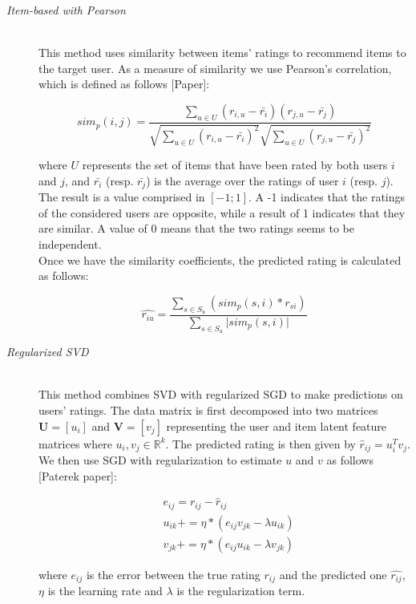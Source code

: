 \documentclass[10pt,conference,compsocconf]{IEEEtran}
\begin{document}
\begin{description}

\item[\emph{Item-based with Pearson}]\ \\
This method uses similarity between items' ratings to recommend items to the target user. As a measure of similarity we use Pearson's correlation, which is defined as follows [Paper]:

$$
sim_p(i, j) = \frac{\sum_{u \in U} (r_{i,u} - \bar{r_i})(r_{j,u} - \bar{r_j})}{\sqrt{\sum_{u \in U} (r_{i,u} - \bar{r_i})^2}	\sqrt{\sum_{u \in U} (r_{j,u} - \bar{r_j})^2}}
$$

where $U$ represents the set of items that have been rated by both users $i$ and $j$, and $\bar{r_i}$ (resp. $\bar{r_j}$) is the average over the ratings of user $i$ (resp. $j$). The result is a value comprised in $[-1;1]$. A -1 indicates that the ratings of the considered users are opposite, while a result of 1 indicates that they are similar. A value of 0 means that the two ratings seems to be independent. \\
Once we have the similarity coefficients, the predicted rating is calculated as follows:

$$
\hat{r_{iu}} = \frac{\sum_{s \in S_u} (sim_p(s, i) \ast r_{si} )}{\sum_{s \in S_u} \vert sim_p(s, i) \vert}
$$ 

\item[\emph{Regularized SVD}]\ \\
This method combines SVD with regularized SGD to make predictions on users' ratings. The data matrix is first decomposed into two matrices $\textbf{U} = \left[ u_i \right]$ and $\textbf{V} = \left[ v_j \right]$ representing the user and item latent feature matrices where $u_i,v_j \in \mathbb{R}^k$. The predicted rating is then given by $\hat{r}_{ij} = u_i^Tv_j$. We then use SGD with regularization to estimate $u$ and $v$ as follows [Paterek paper]:

$$
\begin{aligned}
& e_{ij} = r_{ij} - \hat{r}_{ij} \\
& u_{ik} += \eta \ast (e_{ij}v_{jk} - \lambda u_{ik}) \\
& v_{jk} += \eta \ast (e_{ij}u_{ik} - \lambda v_{jk})
\end{aligned}
$$

\noindent where $e_{ij}$ is the error between the true rating $r_{ij}$ and the predicted one $\hat{r_{ij}}$, $\eta$ is the learning rate and $\lambda$ is the regularization term.



\end{description}
\end{document}

